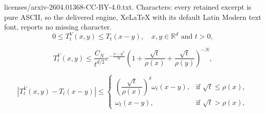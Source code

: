 \documentclass[10pt,a4paper]{amsart}
\begin{document}
licenses/arxiv-2604.01368-CC-BY-4.0.txt. Characters: every retained excerpt is pure ASCII, so the delivered engine, XeLaTeX with its default Latin Modern text font, reports no missing character.
\begin{equation}\label{eq: 1.2}
    0 \leq T_t^V(x,y) \leq T_t(x-y), \quad x, y \in \mathbb{R}^d \text{ and } t > 0,
\end{equation}

\begin{equation}\label{eq: 1.3}
    T_t^V(x,y) \leq \frac{C_N}{t^{d/2}} e^{-\frac{|x-y|^2}{5t}} \left( 1 + \frac{\sqrt{t}}{\rho(x)} + \frac{\sqrt{t}}{\rho(y)}\right)^{-N}, 
\end{equation}

\begin{equation}\label{eq: 1.5}
    |T_t^V(x,y) - T_t(x-y)| \leq \begin{cases}
\left(\dfrac{\sqrt{t}}{\rho(x)}\right)^\delta \omega_t(x-y), & \text{if } \sqrt{t} \leq \rho(x),  \\
\omega_t(x-y), & \text{if } \sqrt{t} > \rho(x),
\end{cases}
\end{equation}
\end{document}
